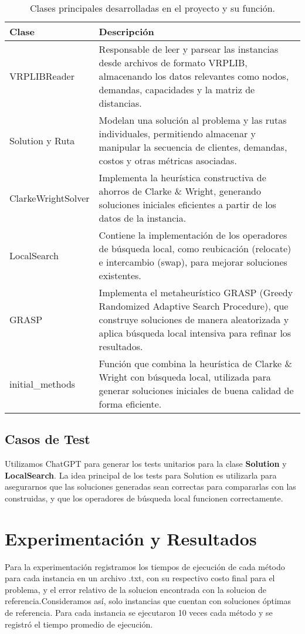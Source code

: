 \documentclass[a4paper,12pt]{article}
\begin{document}
\begin{table}[h!]
\centering
\begin{tabular}{|l|p{10cm}|}
\hline
\textbf{Clase} & \textbf{Descripción} \\
\hline
VRPLIBReader & Responsable de leer y parsear las instancias desde archivos de formato VRPLIB, almacenando los datos relevantes como nodos, demandas, capacidades y la matriz de distancias. \\
\hline
Solution y Ruta & Modelan una solución al problema y las rutas individuales, permitiendo almacenar y manipular la secuencia de clientes, demandas, costos y otras métricas asociadas. \\
\hline
ClarkeWrightSolver & Implementa la heurística constructiva de ahorros de Clarke \& Wright, generando soluciones iniciales eficientes a partir de los datos de la instancia. \\
\hline
LocalSearch & Contiene la implementación de los operadores de búsqueda local, como reubicación (relocate) e intercambio (swap), para mejorar soluciones existentes. \\
\hline
GRASP & Implementa el metaheurístico GRASP (Greedy Randomized Adaptive Search Procedure), que construye soluciones de manera aleatorizada y aplica búsqueda local intensiva para refinar los resultados. \\
\hline
initial\_methods & Función que combina la heurística de Clarke \& Wright con búsqueda local, utilizada para generar soluciones iniciales de buena calidad de forma eficiente. \\
\hline
\end{tabular}
\caption{Clases principales desarrolladas en el proyecto y su función.}
\end{table}

\subsection{Casos de Test}
Utilizamos ChatGPT para generar los tests unitarios para la clase \textbf{Solution} y \textbf{LocalSearch}. La idea principal de los tests para Solution es utilizarla para asegurarnos que las soluciones generadas sean correctas para compararlas con las construidas, y que los operadores de búsqueda local funcionen correctamente.


\section{Experimentación y Resultados}
Para la experimentación registramos los tiempos de ejecución de cada método para cada instancia en un archivo .txt, con su respectivo costo final para el problema, y el error relativo de la solucion encontrada con la solucion de referencia.Consideramos así, solo instancias que cuentan con soluciones óptimas de referencia.
Para cada instancia se ejecutaron 10 veces cada método y se registró el tiempo promedio de ejecución.
\end{document}
